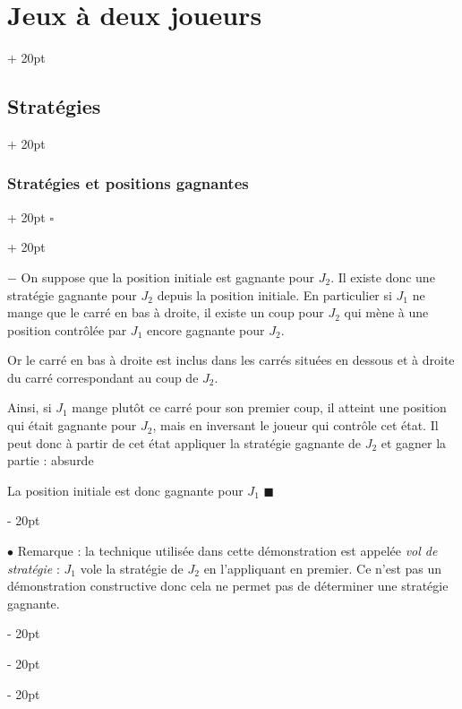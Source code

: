 \documentclass[a4paper, 12pt, twoside]{article}
\newcommand{\ind}[1][20pt]{\advance\leftskip + #1}
\newcommand{\deind}[1][20pt]{\advance\leftskip - #1}
\newenvironment{indt}[2][20pt]{#2 \par \ind[#1]}{\par \deind} %
\newenvironment{proof}[1][{}]{\begin{indt}{$\square$ #1}}{$\blacksquare$ \end{indt}}
\begin{document}
\begin{indt}{\section{Jeux à deux joueurs}}
\begin{indt}{\subsection{Stratégies}}
\begin{indt}{\subsubsection{Stratégies et positions gagnantes}}
\begin{proof}
                    \vspace{6pt}
                    
                    $-$ On suppose que la position initiale est gagnante pour $J_2$.
                    Il existe donc une stratégie gagnante pour $J_2$ depuis la position initiale.
                    En particulier si $J_1$ ne mange que le carré en bas à droite, il existe un coup pour $J_2$ qui mène à une position contrôlée par $J_1$ encore gagnante pour $J_2$.

                    \begin{center}
                    \end{center}

                    Or le carré en bas à droite est inclus dans les carrés situées en dessous et à droite du carré correspondant au coup de $J_2$.

                    Ainsi, si $J_1$ mange plutôt ce carré pour son premier coup, il atteint une position qui était gagnante pour $J_2$, mais en inversant le joueur qui contrôle cet état. Il peut donc à partir de cet état appliquer la stratégie gagnante de $J_2$ et gagner la partie : absurde

                    La position initiale est donc gagnante pour $J_1$
                \end{proof}

                \vspace{12pt}
                
                $\bullet$ Remarque : la technique utilisée dans cette démonstration est appelée \emph{vol de stratégie} : $J_1$ vole la stratégie de $J_2$ en l'appliquant en premier. Ce n'est pas un démonstration constructive donc cela ne permet pas de déterminer une stratégie gagnante.


\end{indt}
\end{indt}
\end{indt}
\end{document}
